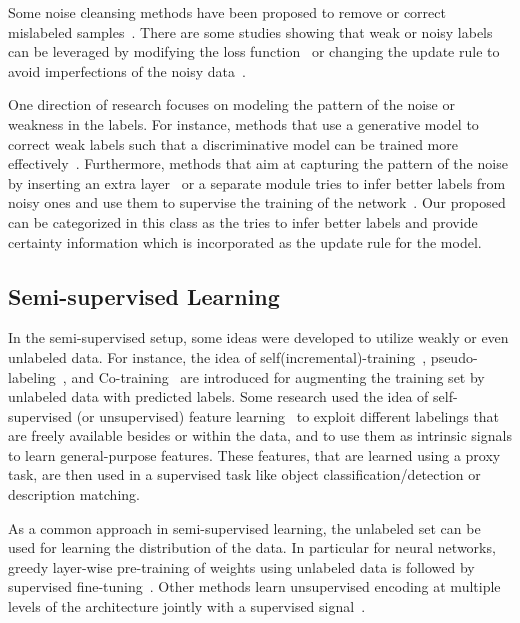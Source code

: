 Some noise cleansing methods have been proposed to remove or correct mislabeled samples~\citep{Brodley:1999}.
There are some studies showing that weak or noisy labels can be leveraged by modifying the loss function~\citep{reed2014training, Patrini:2016, patrini2016loss, Vahdat:2017} or changing the update rule to avoid imperfections of the noisy data~\citep{malach2017decoupling, Dehghani:2017:nips_metalearn, Dehghani:2017avoiding}.  

One direction of research focuses on modeling the pattern of the noise or weakness in the labels. For instance, methods that use a generative model to correct weak labels such that a discriminative model can be trained more effectively~\citep{Ratner:2016,Rekatsinas:2017,Varma:2017}.
Furthermore, methods that aim at capturing the pattern of the noise by inserting an extra layer~\citep{goldberger2016training} or a separate module tries to infer better labels from noisy ones and use them to supervise the training of the network~\citep{Sukhbaatar:2014,Veit:2017, Dehghani:2017:nips_metalearn}. Our proposed \fwl can be categorized in this class as the \tch tries to infer better labels and provide certainty information which is incorporated as the update rule for the \std model.

\subsection{Semi-\:supervised Learning}
In the semi-supervised setup, some ideas were developed to utilize weakly or even unlabeled data. For instance, the idea of self(incremental)-training~\citep{Rosenberg:2005}, pseudo-labeling~\citep{Lee:2013,Hinton:2015}, and Co-training~\citep{Blum:1998} are introduced for augmenting the training set by unlabeled data with predicted labels.
Some research used the idea of self-supervised (or unsupervised) feature learning~\citep{noroozi2016unsupervised,dosovitskiy2016discriminative,donahue2016adversarial} to exploit different labelings that are freely available besides or within the data, and to use them as intrinsic signals to learn general-purpose features. These features, that are learned using a proxy task, are then used in a supervised task like object classification/detection or description matching.

As a common approach in semi-supervised learning, the unlabeled set can be used for learning the distribution of the data. In particular for neural networks, greedy layer-wise pre-training of weights using unlabeled data is followed by supervised fine-tuning~\citep{Hinton:2006,Deriu:2017,Severyn:2015:SemEval,Severyn:2015:SIGIR,Go:2009}. Other methods learn unsupervised encoding at multiple levels of the architecture jointly with a supervised signal~\citep{Ororbia:2015,Weston:2012}.


